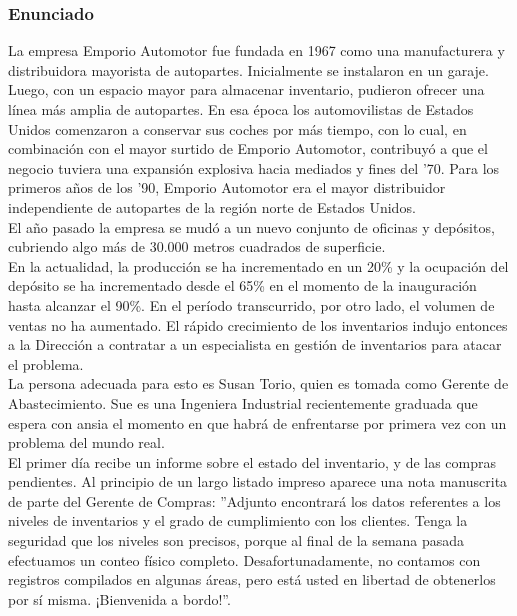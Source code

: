 \documentclass[a4paper,10pt,titlepage]{article}
\begin{document}
\subsubsection{Enunciado}

		\indent La empresa Emporio Automotor fue fundada en 1967 como una manufacturera y distribuidora mayorista de autopartes. Inicialmente se instalaron en un garaje. Luego, con un espacio mayor para almacenar inventario, pudieron ofrecer una l\' inea m\' as amplia de autopartes. En esa \'epoca los automovilistas de Estados Unidos comenzaron a conservar sus coches por m\'as tiempo, con lo cual, en combinaci\'on con el mayor surtido de Emporio Automotor, contribuy\'o a que el negocio tuviera una expansi\'on explosiva hacia mediados y fines del '70. Para los primeros años de los ’90, Emporio Automotor era el mayor distribuidor independiente de autopartes de la regi\'on norte de Estados Unidos.\\
		\indent El año pasado la empresa se mud\'o a un nuevo conjunto de oficinas y dep\'ositos, cubriendo algo m\'as de 30.000 metros cuadrados de superficie.\\
		\indent En la actualidad, la producci\'on se ha incrementado en un 20\% y la ocupaci\'on del dep\'osito se ha incrementado desde el 65\% en el momento de la inauguraci\'on hasta alcanzar el 90\%. En el per\'iodo transcurrido, por otro lado, el volumen de ventas no ha aumentado. El r\'apido crecimiento de los inventarios indujo entonces a la Direcci\'on a contratar a un especialista en gesti\'on de inventarios para atacar el problema.\\
		\indent La persona adecuada para esto es Susan Torio, quien es tomada como Gerente de Abastecimiento. Sue es una Ingeniera Industrial recientemente graduada que espera con ansia el momento en que habr\'a de enfrentarse por primera vez con un problema del mundo real.\\
		\indent El primer d\'ia recibe un informe sobre el estado del inventario, y de las compras pendientes. Al principio de un largo listado impreso aparece una nota manuscrita de parte del Gerente de Compras: ''Adjunto encontrar\'a los datos referentes a los niveles de inventarios y el grado de cumplimiento con los clientes. Tenga la seguridad que los niveles son precisos, porque al final de la semana pasada efectuamos un conteo f\'isico completo. Desafortunadamente, no contamos con registros compilados en algunas \'areas, pero est\'a usted en libertad de obtenerlos por s\'i misma. ¡Bienvenida a bordo!''.\\
\end{document}
